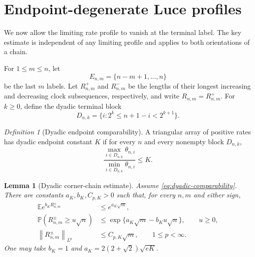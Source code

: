 \documentclass[11pt]{article}
\newtheorem{lemma}[theorem]{Lemma}
\theoremstyle{remark}
\newtheorem{definition}[theorem]{Definition}
\newcommand{\Pp}{\mathbb P}
\newcommand{\Ee}{\mathbb E}
\newcommand{\norm}[1]{\left\lVert #1\right\rVert}
\begin{document}
\section{Endpoint-degenerate Luce profiles}
\label{sec:endpoint}

We now allow the limiting rate profile to vanish at the terminal label.  The
key estimate is independent of any limiting profile and applies to both
orientations of a chain.

For $1\le m\le n$, let
\[
        E_{n,m}=\{n-m+1,\dots,n\}
\]
be the last $m$ labels.  Let $R_{n,m}^+$ and $R_{n,m}^-$ be the lengths of
their longest increasing and decreasing clock subsequences, respectively,
and write $R_{n,m}=R_{n,m}^+$.  For $k\ge0$, define the dyadic terminal block
\begin{equation}\label{eq:dyadic-block}
 D_{n,k}
 =\{i:2^k\le n+1-i<2^{k+1}\}.
\end{equation}

\begin{definition}[Dyadic endpoint comparability]
\label{def:dyadic-comparability}
A triangular array of positive rates has dyadic endpoint constant $K$ if
for every $n$ and every nonempty block $D_{n,k}$,
\begin{equation}\label{eq:dyadic-comparability}
 \frac{\max_{i\in D_{n,k}}\theta_{n,i}}
      {\min_{i\in D_{n,k}}\theta_{n,i}}
 \le K.
\end{equation}
\end{definition}

\begin{lemma}[Dyadic corner-chain estimate]
\label{lem:dyadic-corner}
Assume \eqref{eq:dyadic-comparability}.  There are constants
$a_K,b_K,C_{p,K}>0$ such that, for every $n,m$ and either sign,
\begin{align}
 \Ee e^{b_KR_{n,m}^{\pm}}&\le e^{a_K\sqrt m},
 \label{eq:corner-mgf}\\
 \Pp(R_{n,m}^{\pm}\ge u\sqrt n)
 &\le\exp\{a_K\sqrt m-b_Ku\sqrt n\},
 \qquad u\ge0,
 \label{eq:corner-tail}\\
 \norm{R_{n,m}^{\pm}}_{L^p}&\le C_{p,K}\sqrt m,
 \qquad 1\le p<\infty.
 \label{eq:corner-Lp}
\end{align}
One may take $b_K=1$ and
$a_K=2(2+\sqrt2)\sqrt{eK}$.
\end{lemma}
\end{document}

